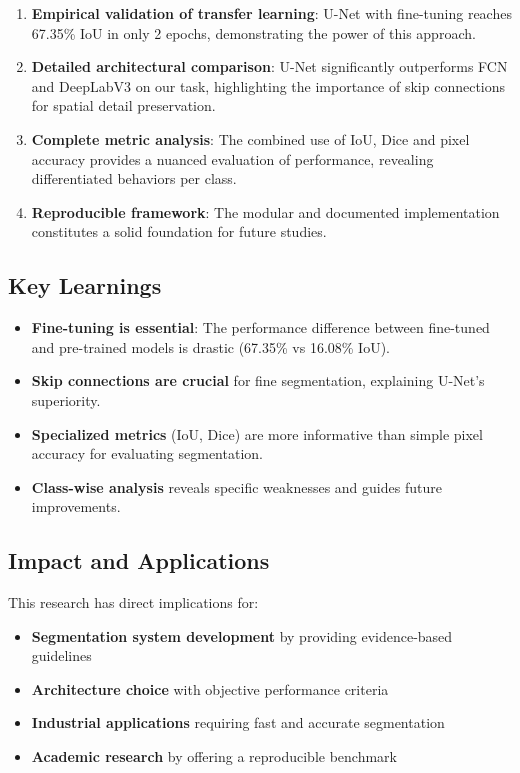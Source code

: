 \documentclass[12pt,a4paper]{article}
\begin{document}
\begin{enumerate}
    \item \textbf{Empirical validation of transfer learning}: U-Net with fine-tuning reaches 67.35\% IoU in only 2 epochs, demonstrating the power of this approach.

    \item \textbf{Detailed architectural comparison}: U-Net significantly outperforms FCN and DeepLabV3 on our task, highlighting the importance of skip connections for spatial detail preservation.

    \item \textbf{Complete metric analysis}: The combined use of IoU, Dice and pixel accuracy provides a nuanced evaluation of performance, revealing differentiated behaviors per class.

    \item \textbf{Reproducible framework}: The modular and documented implementation constitutes a solid foundation for future studies.
\end{enumerate}

\subsection{Key Learnings}

\begin{itemize}
    \item \textbf{Fine-tuning is essential}: The performance difference between fine-tuned and pre-trained models is drastic (67.35\% vs 16.08\% IoU).
    \item \textbf{Skip connections are crucial} for fine segmentation, explaining U-Net's superiority.
    \item \textbf{Specialized metrics} (IoU, Dice) are more informative than simple pixel accuracy for evaluating segmentation.
    \item \textbf{Class-wise analysis} reveals specific weaknesses and guides future improvements.
\end{itemize}

\subsection{Impact and Applications}

This research has direct implications for:
\begin{itemize}
    \item \textbf{Segmentation system development} by providing evidence-based guidelines
    \item \textbf{Architecture choice} with objective performance criteria
    \item \textbf{Industrial applications} requiring fast and accurate segmentation
    \item \textbf{Academic research} by offering a reproducible benchmark
\end{itemize}
\end{document}
